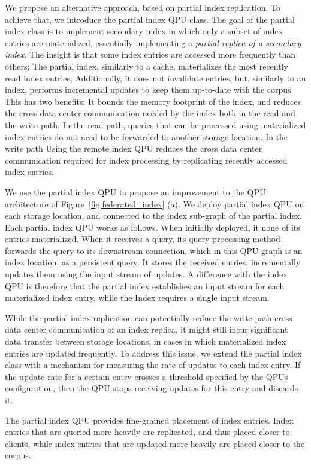 We propose an alternative approach, based on partial index replication.
To achieve that, we introduce the partial index QPU class.
The goal of the partial index class is to implement secondary index in which only a subset of index entries are materialized,
essentially implementing a \textit{partial replica of a secondary index}.
The insight is that some index entries are accessed more frequently than others;
The partial index, similarly to a cache, materializes the most recently read index entries;
Additionally, it does not invalidate entries, but, similarly to an index, performs incremental updates to keep them up-to-date
with the corpus.
This has two benefits:
It bounds the memory footprint of the index, and reduces the cross data center communication needed by the index both in the read and the write path.
In the read path, queries that can be processed using materialized index entries do not need to be forwarded to
another storage location.
In the write path
Using the remote index QPU reduces the cross data center communication required for index processing by
replicating recently accessed index entries.

We use the partial index QPU to propose an improvement to the QPU architecture of Figure~\ref{fig:federated_index} (a).
We deploy partial index QPU on each storage location, and connected to the index sub-graph of the partial index.
Each partial index QPU works as follows.
When initially deployed, it none of its entries materialized.
When it receives a query, its query processing method forwards the query to its downstream connection,
which in this QPU graph is an index location, as a persistent query.
It stores the received entries, incrementally updates them using the input stream of updates.
A difference with the index QPU is therefore that the partial index establishes an input stream for each materialized
index entry, while the Index requires a single input stream.

While the partial index replication can potentially reduce the write path cross data center communication of an index replica,
it might still incur significant data transfer between storage locations,
in cases in which materialized index entries are updated frequently.
To address this issue,
we extend the partial index class with a mechanism for measuring the rate of updates to each index entry.
If the update rate for a certain entry crosses a threshold specified by the QPUs configuration,
then the QPU stops receiving updates for this entry and discards it.

The partial index QPU provides fine-grained placement of index entries.
Index entries that are queried more heavily are replicated, and thus placed closer to clients,
while index entries that are updated more heavily are placed closer to the corpus.

